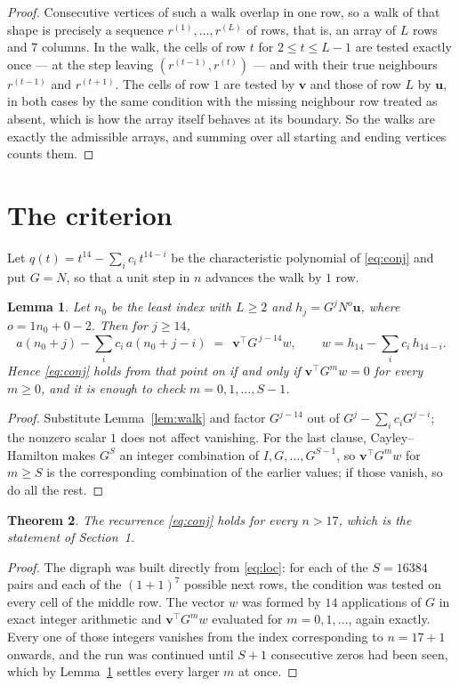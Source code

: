 \documentclass[11pt,a4paper]{article}
\theoremstyle{plain}
\newtheorem{theorem}{Theorem}
\newtheorem{lemma}[theorem]{Lemma}
\theoremstyle{definition}
\begin{document}
\begin{proof}
Consecutive vertices of such a walk overlap in one row, so a walk of that shape is
precisely a sequence $r^{(1)},\dots,r^{(L)}$ of rows, that is, an array of $L$ rows
and $7$ columns. In the walk, the cells of row $t$ for $2\le t\le L-1$ are tested
exactly once --- at the step leaving $(r^{(t-1)},r^{(t)})$ --- and with their true
neighbours $r^{(t-1)}$ and $r^{(t+1)}$. The cells of row $1$ are tested by
$\mathbf{v}$ and those of row $L$ by $\mathbf{u}$, in both cases by the same condition
with the missing neighbour row treated as absent, which is how the array itself behaves at
its boundary. So the walks are exactly the admissible arrays, and summing over all starting
and ending vertices counts them.
\end{proof}

\section{The criterion}

Let $q(t)=t^{14}-\sum_i c_i\,t^{14-i}$ be the characteristic polynomial of
\eqref{eq:conj} and put $G=N$, so that a unit step in $n$ advances the walk by
$1$ row.

\begin{lemma}\label{lem:crit}
Let $n_0$ be the least index with $L\ge2$ and $h_j=G^{j}N^{o}\mathbf{u}$, where
$o=1n_0+0-2$. Then for $j\ge14$,
\[
a(n_0+j)-\sum_i c_i\,a(n_0+j-i)\;=\;\,\mathbf{v}^{\!\top}G^{\,j-14}w,
\qquad w=h_{14}-\sum_i c_i\,h_{14-i} .
\]
Hence \eqref{eq:conj} holds from that point on if and only if
$\mathbf{v}^{\!\top}G^{m}w=0$ for every $m\ge0$, and it is enough to check
$m=0,1,\dots,S-1$.
\end{lemma}

\begin{proof}
Substitute Lemma~\ref{lem:walk} and factor $G^{j-14}$ out of
$G^{j}-\sum_ic_iG^{j-i}$; the nonzero scalar $1$ does not affect
vanishing. For the last clause, Cayley--Hamilton makes $G^{S}$ an integer combination of
$I,G,\dots,G^{S-1}$, so $\mathbf{v}^{\!\top}G^{m}w$ for $m\ge S$ is the corresponding
combination of the earlier values; if those vanish, so do all the rest.
\end{proof}

\begin{theorem}
The recurrence \eqref{eq:conj} holds for every $n>17$, which is the statement of
Section~1.
\end{theorem}

\begin{proof}
The digraph was built directly from \eqref{eq:loc}: for each of the $S=16384$ pairs and each
of the $(1+1)^{7}$ possible next rows, the condition was tested on every cell of
the middle row. The vector $w$ was formed by $14$ applications of $G$ in exact integer
arithmetic and $\mathbf{v}^{\!\top}G^{m}w$ evaluated for $m=0,1,\dots$, again exactly.
Every one of those integers vanishes from the index corresponding to $n=17+1$ onwards,
and the run was continued until $S+1$ consecutive zeros had been seen, which by
Lemma~\ref{lem:crit} settles every larger $m$ at once.
\end{proof}
\end{document}
